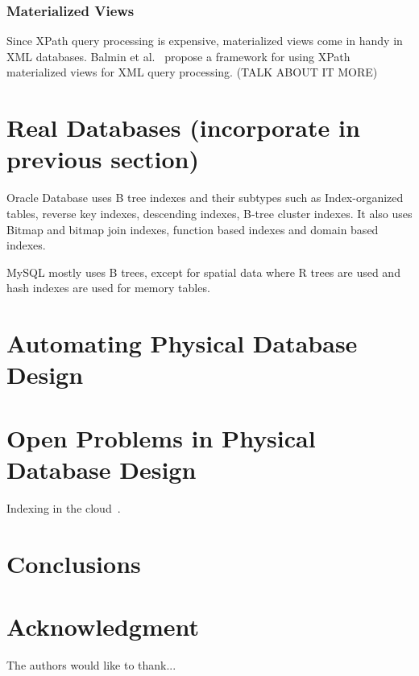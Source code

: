 \documentclass[12pt,a4paper]{article}
\begin{document}
\subsubsection{Materialized Views}

Since XPath query processing is expensive, materialized views come in handy in XML databases. Balmin et al.~\cite{balmin2004framework} propose a framework for using XPath materialized views for XML query processing. (TALK ABOUT IT MORE)

\section{Real Databases (incorporate in previous section)}

Oracle Database uses B tree indexes and their subtypes such as Index-organized tables, reverse key indexes, descending indexes, B-tree cluster indexes. It also uses Bitmap and bitmap join indexes, function based indexes and domain based indexes.

MySQL mostly uses B trees, except for spatial data where R trees are used and hash indexes are used for memory tables.

\section{Automating Physical Database Design}
\label{SEC-AUTO}

\section{Open Problems in Physical Database Design}
\label{SEC-OPEN}

Indexing in the cloud~\cite{wang2010indexing}.

\section{Conclusions}
\label{SEC-CONCL}

\section*{Acknowledgment}


The authors would like to thank...



%








\end{document}
